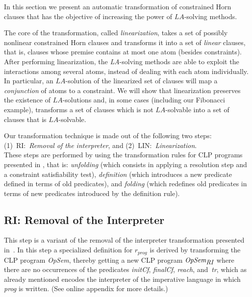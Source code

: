 \documentclass[english]{tlp}
\begin{document}
In this section we present an automatic transformation of
constrained Horn clauses that has the objective of increasing the power of
 ${\textit{LA}}$-solving methods. 
 
The core of the transformation, called {\it linearization}, 
takes a set of possibly 
nonlinear constrained Horn clauses and transforms it
 into a set of {\it linear} clauses,
that is, clauses whose premise contains at most one atom (besides constraints).
After performing linearization, the {\it LA}-solving methods are able
to exploit the interactions among several atoms,
instead of dealing with each atom individually.
In particular, an ${\textit{LA}}$-solution of the linearized set of clauses
will map a {\it conjunction} of atoms
to a constraint.
We will show that {\rm linearization} preserves the existence of 
 ${\textit{LA}}$-solutions and,
in some cases (including our Fibonacci example), transforms a set of clauses 
which is not ${\textit{LA}}$-solvable into a set of clauses that is 
${\textit{LA}}$-solvable.


Our transformation technique is made out of the following two steps:\\
(1)~RI:~{\it Removal of the interpreter}, and
(2)~LIN:~{\it Linearization}.\\ 
These steps
 are performed by using the 
transformation rules for CLP programs presented in \cite{EtG96}, that is:
 {\it unfolding} (which consists in applying a resolution step
and a constraint satisfiability test), {\it definition} (which 
introduces a new predicate defined in terms of old predicates), 
and {\it folding} (which redefines old predicates
in terms of new predicates introduced by the definition rule).

\subsection{{\bf{RI:}} Removal of the Interpreter}
\label{subsec:removal}


This step is a variant of the  {removal of the interpreter}
transformation presented in~\cite{De&14c}.
In this step a specialized definition for  $r_{\textit{prog}}$ is derived
by transforming the CLP program \textit{OpSem}, thereby getting a new
CLP program $\textit{OpSem}_{\textit{\small{RI}}}$ where there are
no occurrences of the predicates {\it initCf}, {\it finalCf},
{\it reach}, and~{\it tr}, which as already mentioned 
encodes the interpreter of the imperative language in 
which {\it prog} is written.
(See online appendix for more details.)
\end{document}
